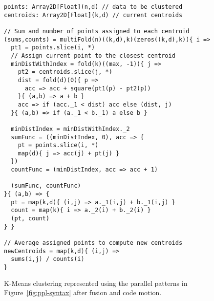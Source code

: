 \begin{figure}\centering
\begin{lstlisting}
points: Array2D[Float](n,d) // data to be clustered
centroids: Array2D[Float](k,d) // current centroids

// Sum and number of points assigned to each centroid
(sums,counts) = multiFold(n)((k,d),k)(zeros((k,d),k)){ i =>
  pt1 = points.slice(i, *)
  // Assign current point to the closest centroid
  minDistWithIndex = fold(k)((max, -1)){ j =>
    pt2 = centroids.slice(j, *)
    dist = fold(d)(0){ p =>
      acc => acc + square(pt1(p) - pt2(p))
    }{ (a,b) => a + b }
    acc => if (acc._1 < dist) acc else (dist, j)
  }{ (a,b) => if (a._1 < b._1) a else b }

  minDistIndex = minDistWithIndex._2
  sumFunc = ((minDistIndex, 0), acc => {
    pt = points.slice(i, *)
    map(d){ j => acc(j) + pt(j) }
  })
  countFunc = (minDistIndex, acc => acc + 1)

  (sumFunc, countFunc)
}{ (a,b) => {
  pt = map(k,d){ (i,j) => a._1(i,j) + b._1(i,j) }
  count = map(k){ i => a._2(i) + b._2(i) }
  (pt, count)
} }

// Average assigned points to compute new centroids
newCentroids = map(k,d){ (i,j) =>
  sums(i,j) / counts(i)
}
\end{lstlisting}
\caption{K-Means clustering represented using the parallel patterns in Figure~\ref{fig:ppl-syntax} after fusion and code motion.}
\label{fig:kmeans-fused}
\end{figure}

